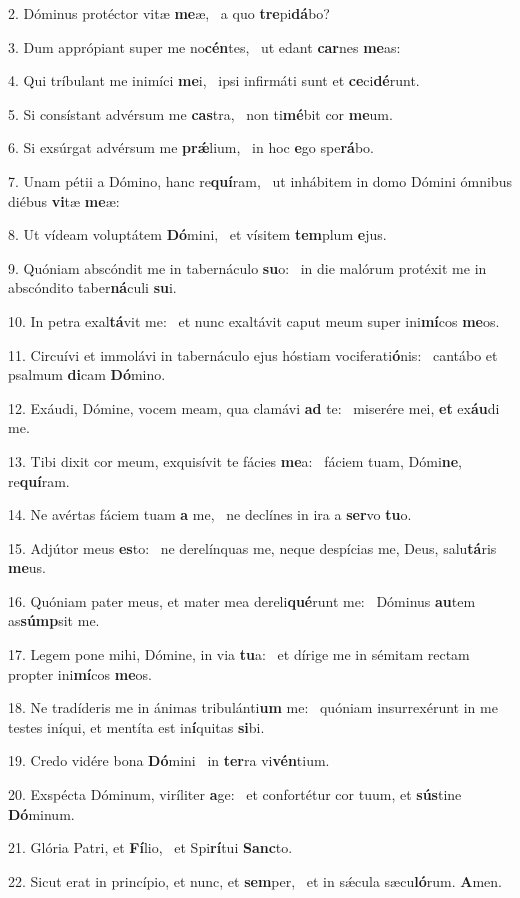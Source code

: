 2. Dóminus protéctor vitæ \textbf{me}æ, \ast\  a quo \textbf{tre}pi\textbf{dá}bo?\

3. Dum apprópiant super me no\textbf{cén}tes, \ast\  ut edant \textbf{car}nes \textbf{me}as:\

4. Qui tríbulant me inimíci \textbf{me}i, \ast\  ipsi infirmáti sunt et \textbf{ce}ci\textbf{dé}runt.\

5. Si consístant advérsum me \textbf{cas}tra, \ast\  non ti\textbf{mé}bit cor \textbf{me}um.\

6. Si exsúrgat advérsum me \textbf{prǽ}lium, \ast\  in hoc \textbf{e}go spe\textbf{rá}bo.\

7. Unam pétii a Dómino, hanc re\textbf{quí}ram, \ast\  ut inhábitem in domo Dómini ómnibus diébus \textbf{vi}tæ \textbf{me}æ:\

8. Ut vídeam voluptátem \textbf{Dó}mini, \ast\  et vísitem \textbf{tem}plum \textbf{e}jus.\

9. Quóniam abscóndit me in tabernáculo \textbf{su}o: \ast\  in die malórum protéxit me in abscóndito taber\textbf{ná}culi \textbf{su}i.\

10. In petra exal\textbf{tá}vit me: \ast\  et nunc exaltávit caput meum super ini\textbf{mí}cos \textbf{me}os.\

11. Circuívi et immolávi in tabernáculo ejus hóstiam vociferati\textbf{ó}nis: \ast\  cantábo et psalmum \textbf{di}cam \textbf{Dó}mino.\

12. Exáudi, Dómine, vocem meam, qua clamávi \textbf{ad} te: \ast\  miserére mei, \textbf{et} ex\textbf{áu}di me.\

13. Tibi dixit cor meum, exquisívit te fácies \textbf{me}a: \ast\  fáciem tuam, Dómi\textbf{ne}, re\textbf{quí}ram.\

14. Ne avértas fáciem tuam \textbf{a} me, \ast\  ne declínes in ira a \textbf{ser}vo \textbf{tu}o.\

15. Adjútor meus \textbf{es}to: \ast\  ne derelínquas me, neque despícias me, Deus, salu\textbf{tá}ris \textbf{me}us.\

16. Quóniam pater meus, et mater mea dereli\textbf{qué}runt me: \ast\  Dóminus \textbf{au}tem as\textbf{súmp}sit me.\

17. Legem pone mihi, Dómine, in via \textbf{tu}a: \ast\  et dírige me in sémitam rectam propter ini\textbf{mí}cos \textbf{me}os.\

18. Ne tradíderis me in ánimas tribulánti\textbf{um} me: \ast\  quóniam insurrexérunt in me testes iníqui, et mentíta est in\textbf{í}quitas \textbf{si}bi.\

19. Credo vidére bona \textbf{Dó}mini \ast\  in \textbf{ter}ra vi\textbf{vén}tium.\

20. Exspécta Dóminum, viríliter \textbf{a}ge: \ast\  et confortétur cor tuum, et \textbf{sús}tine \textbf{Dó}minum.\

21. Glória Patri, et \textbf{Fí}lio, \ast\  et Spi\textbf{rí}tui \textbf{Sanc}to.\

22. Sicut erat in princípio, et nunc, et \textbf{sem}per, \ast\  et in sǽcula sæcu\textbf{ló}rum. \textbf{A}men.\

